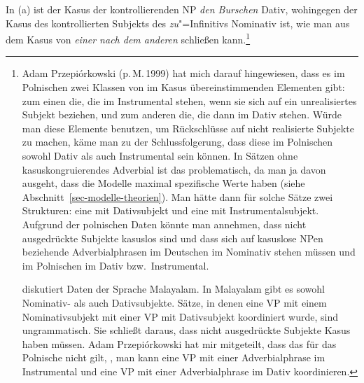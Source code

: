In (a) ist der Kasus der kontrollierenden NP \emph{den Burschen} Dativ, wohingegen
der Kasus des kontrollierten Subjekts des \emph{zu}"=Infinitivs Nominativ ist,
wie man aus dem Kasus von \emph{einer nach dem anderen} schließen kann.\footnote{
        Adam Przepiórkowski (p.\,M.\,1999) hat mich darauf hingewiesen,
        dass es im Polnischen zwei Klassen von im Kasus übereinstimmenden Elementen
        gibt: zum einen die, die im Instrumental stehen, wenn sie sich auf ein
        unrealisiertes Subjekt beziehen, und zum anderen die, die dann im Dativ stehen.
        Würde man diese Elemente benutzen, um Rückschlüsse auf nicht realisierte Subjekte zu
        machen, käme man zu der Schlussfolgerung, dass diese im Polnischen sowohl Dativ als auch Instrumental
        sein können. In Sätzen ohne kasuskongruierendes Adverbial ist das problematisch, da man ja
        davon ausgeht, dass die Modelle maximal spezifische Werte haben (siehe
        Abschnitt~\ref{sec-modelle-theorien}). Man hätte dann für solche Sätze zwei Strukturen: eine
        mit Dativsubjekt und eine mit Instrumentalsubjekt.
        Aufgrund der polnischen Daten könnte man annehmen, dass nicht ausgedrückte Subjekte kasuslos sind
        und dass sich auf kasuslose NPen beziehende Adverbialphrasen im Deutschen im Nominativ stehen müssen
        und im Polnischen im Dativ bzw.\ Instrumental.

        \citet{Hennis89} diskutiert Daten der Sprache Malayalam. In
        Malayalam gibt es sowohl Nominativ- als auch Dativsubjekte. Sätze, in denen eine VP mit
        einem Nominativsubjekt mit einer VP mit Dativsubjekt koordiniert wurde, sind ungrammatisch.
        Sie schließt daraus, dass nicht ausgedrückte Subjekte Kasus haben müssen.
        Adam Przepiórkowski hat mir mitgeteilt, dass das für das Polnische nicht gilt,
        \dash, man kann eine VP mit einer Adverbialphrase im Instrumental und eine VP
        mit einer Adverbialphrase im Dativ koordinieren.

}
